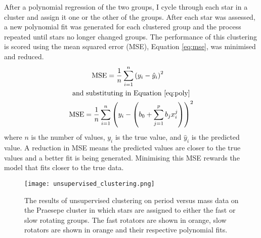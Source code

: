 \documentclass[fleqn,usenatbib]{mnras}
\begin{document}
After a polynomial regression of the two groups, I cycle through each star in a cluster and assign it one or the other of the groups.
After each star was assessed, a new polynomial fit was generated for each clustered group and the process repeated until stars no longer changed groups.
The performance of this clustering is scored using the mean squared error (MSE), Equation \ref{eq:mse}, was minimised and reduced.
\begin{gather}
	\begin{aligned}
		\label{eq:mse}
		\textup{MSE} &= \frac{1}{n}\sum_{i=1}^n \left(y_i - \hat{y}_i\right)^2
	\end{aligned}
	\\
	\begin{aligned}
		\textup{and substituting in Equation \ref{eq:poly}}\nonumber
	\end{aligned}
	\\
	\begin{aligned}
		\textup{MSE} = \frac{1}{n}\sum_{i = 1}^n \left(y_i - \left(b_0 + \sum_{j = 1}^p b_jx_i^j\right) \right)^2
	\end{aligned}
\end{gather}
where $n$ is the number of values, $y_i$ is the true value, and $\hat{y}_i$ is the predicted value.
A reduction in MSE means the predicted values are closer to the true values and a better fit is being generated.
Minimising this MSE rewards the model that fits closer to the true data.

\begin{figure}
	\texttt{[image: unsupervised\_clustering.png]}
	\caption{The results of unsupervised clustering on period versus mass data on the Praesepe cluster in which stars are assigned to either the fast or slow rotating groups. The fast rotators are shown in orange, slow rotators are shown in orange and their respective polynomial fits.}
	\label{fig:unsupervised_clustering}
\end{figure}
\end{document}
